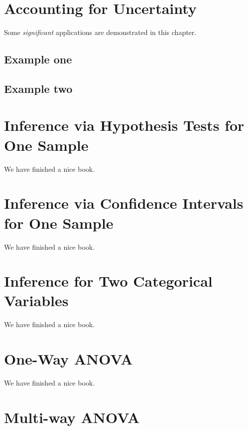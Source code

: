 \documentclass[]{book}
\begin{document}
\hypertarget{accounting-for-uncertainty}{%
\chapter{Accounting for Uncertainty}\label{accounting-for-uncertainty}}

Some \emph{significant} applications are demonstrated in this chapter.

\hypertarget{example-one}{%
\section{Example one}\label{example-one}}

\hypertarget{example-two}{%
\section{Example two}\label{example-two}}

\hypertarget{HT}{%
\chapter{Inference via Hypothesis Tests for One Sample}\label{HT}}

We have finished a nice book.

\hypertarget{CI}{%
\chapter{Inference via Confidence Intervals for One Sample}\label{CI}}

We have finished a nice book.

\hypertarget{twocategorical}{%
\chapter{Inference for Two Categorical Variables}\label{twocategorical}}

We have finished a nice book.

\hypertarget{anova}{%
\chapter{One-Way ANOVA}\label{anova}}

We have finished a nice book.

\hypertarget{multiway}{%
\chapter{Multi-way ANOVA}\label{multiway}}
\end{document}
